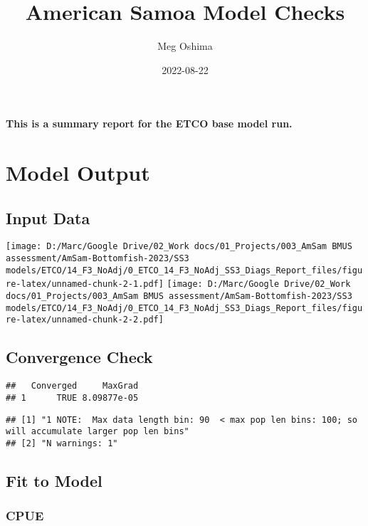 \documentclass[
]{article}
\title{American Samoa Model Checks}
\author{Meg Oshima}
\date{2022-08-22}
\begin{document}
\maketitle

\textbf{This is a summary report for the ETCO base model run.}

\hypertarget{model-output}{%
\section{Model Output}\label{model-output}}

\hypertarget{input-data}{%
\subsection{Input Data}\label{input-data}}

\texttt{[image: D:/Marc/Google Drive/02\_Work docs/01\_Projects/003\_AmSam BMUS assessment/AmSam-Bottomfish-2023/SS3 models/ETCO/14\_F3\_NoAdj/0\_ETCO\_14\_F3\_NoAdj\_SS3\_Diags\_Report\_files/figure-latex/unnamed-chunk-2-1.pdf]}
\texttt{[image: D:/Marc/Google Drive/02\_Work docs/01\_Projects/003\_AmSam BMUS assessment/AmSam-Bottomfish-2023/SS3 models/ETCO/14\_F3\_NoAdj/0\_ETCO\_14\_F3\_NoAdj\_SS3\_Diags\_Report\_files/figure-latex/unnamed-chunk-2-2.pdf]}

\hypertarget{convergence-check}{%
\subsection{Convergence Check}\label{convergence-check}}

\begin{verbatim}
##   Converged     MaxGrad
## 1      TRUE 8.09877e-05
\end{verbatim}

\begin{verbatim}
## [1] "1 NOTE:  Max data length bin: 90  < max pop len bins: 100; so will accumulate larger pop len bins"
## [2] "N warnings: 1"
\end{verbatim}

\hypertarget{fit-to-model}{%
\subsection{Fit to Model}\label{fit-to-model}}

\hypertarget{cpue}{%
\subsubsection{CPUE}\label{cpue}}
\end{document}
